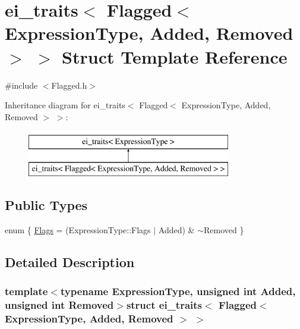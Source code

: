 \hypertarget{structei__traits_3_01_flagged_3_01_expression_type_00_01_added_00_01_removed_01_4_01_4}{\section{ei\-\_\-traits$<$ Flagged$<$ Expression\-Type, Added, Removed $>$ $>$ Struct Template Reference}
\label{structei__traits_3_01_flagged_3_01_expression_type_00_01_added_00_01_removed_01_4_01_4}
}


{\ttfamily \#include $<$Flagged.\-h$>$}

Inheritance diagram for ei\-\_\-traits$<$ Flagged$<$ Expression\-Type, Added, Removed $>$ $>$\-:\begin{figure}[H]
\begin{center}
\leavevmode
\includegraphics[height=2.000000cm]{structei__traits_3_01_flagged_3_01_expression_type_00_01_added_00_01_removed_01_4_01_4}
\end{center}
\end{figure}
\subsection*{Public Types}
\begin{DoxyCompactItemize}
\item 
enum \{ \hyperlink{structei__traits_3_01_flagged_3_01_expression_type_00_01_added_00_01_removed_01_4_01_4_abede5f325899f1e232496745890a4f6da7575a08a7a8eb5cd2cd0dd88b1c3af7d}{Flags} = (Expression\-Type\-:\-:Flags $|$ Added) \& $\sim$\-Removed
 \}
\end{DoxyCompactItemize}


\subsection{Detailed Description}
\subsubsection*{template$<$typename Expression\-Type, unsigned int Added, unsigned int Removed$>$struct ei\-\_\-traits$<$ Flagged$<$ Expression\-Type, Added, Removed $>$ $>$}




